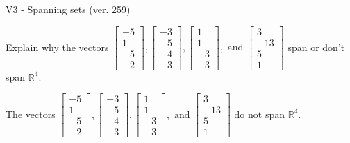 \begin{exercise}
  \begin{exerciseTitle}V3 - Spanning sets (ver. 259)\end{exerciseTitle}
  \begin{exerciseStatement}
    Explain why the vectors \(\left[\begin{array}{r}
-5 \\
1 \\
-5 \\
-2
\end{array}\right] , \left[\begin{array}{r}
-3 \\
-5 \\
-4 \\
-3
\end{array}\right] , \left[\begin{array}{r}
1 \\
1 \\
-3 \\
-3
\end{array}\right] , \text{ and } \left[\begin{array}{r}
3 \\
-13 \\
5 \\
1
\end{array}\right]\) span or don't span \(\mathbb{R}^4\). 
	


  \end{exerciseStatement}
  \begin{exerciseAnswer}
   The vectors \(\left[\begin{array}{r}
-5 \\
1 \\
-5 \\
-2
\end{array}\right] , \left[\begin{array}{r}
-3 \\
-5 \\
-4 \\
-3
\end{array}\right] , \left[\begin{array}{r}
1 \\
1 \\
-3 \\
-3
\end{array}\right] , \text{ and } \left[\begin{array}{r}
3 \\
-13 \\
5 \\
1
\end{array}\right]\) 
  	 do not  
	span \(\mathbb{R}^4\).
  


  \end{exerciseAnswer}
\end{exercise}